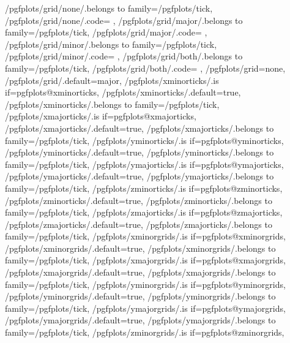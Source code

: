 {	/pgfplots/grid/none/.belongs to family=/pgfplots/tick,
	/pgfplots/grid/none/.code={%
		\pgfplots@xminorgridsfalse
		\pgfplots@yminorgridsfalse
		\pgfplots@zminorgridsfalse
		\pgfplots@xmajorgridsfalse
		\pgfplots@ymajorgridsfalse
		\pgfplots@zmajorgridsfalse
	},
	/pgfplots/grid/major/.belongs to family=/pgfplots/tick,
	/pgfplots/grid/major/.code={%
		\pgfplots@xminorgridsfalse
		\pgfplots@yminorgridsfalse
		\pgfplots@zminorgridsfalse
		\pgfplots@xmajorgridstrue
		\pgfplots@ymajorgridstrue
		\pgfplots@zmajorgridstrue
	},
	/pgfplots/grid/minor/.belongs to family=/pgfplots/tick,
	/pgfplots/grid/minor/.code={%
		\pgfplots@xminorgridstrue
		\pgfplots@yminorgridstrue
		\pgfplots@zminorgridstrue
		\pgfplots@xmajorgridsfalse
		\pgfplots@ymajorgridsfalse
		\pgfplots@zmajorgridsfalse
	},
	/pgfplots/grid/both/.belongs to family=/pgfplots/tick,
	/pgfplots/grid/both/.code={%
		\pgfplots@xminorgridstrue
		\pgfplots@yminorgridstrue
		\pgfplots@zminorgridstrue
		\pgfplots@xmajorgridstrue
		\pgfplots@ymajorgridstrue
		\pgfplots@zmajorgridstrue
	},
	/pgfplots/grid=none,
	/pgfplots/grid/.default=major,
	/pgfplots/xminorticks/.is if=pgfplots@xminorticks,
	/pgfplots/xminorticks/.default=true,
	/pgfplots/xminorticks/.belongs to family=/pgfplots/tick,
	/pgfplots/xmajorticks/.is if=pgfplots@xmajorticks,
	/pgfplots/xmajorticks/.default=true,
	/pgfplots/xmajorticks/.belongs to family=/pgfplots/tick,
	/pgfplots/yminorticks/.is if=pgfplots@yminorticks,
	/pgfplots/yminorticks/.default=true,
	/pgfplots/yminorticks/.belongs to family=/pgfplots/tick,
	/pgfplots/ymajorticks/.is if=pgfplots@ymajorticks,
	/pgfplots/ymajorticks/.default=true,
	/pgfplots/ymajorticks/.belongs to family=/pgfplots/tick,
	/pgfplots/zminorticks/.is if=pgfplots@zminorticks,
	/pgfplots/zminorticks/.default=true,
	/pgfplots/zminorticks/.belongs to family=/pgfplots/tick,
	/pgfplots/zmajorticks/.is if=pgfplots@zmajorticks,
	/pgfplots/zmajorticks/.default=true,
	/pgfplots/zmajorticks/.belongs to family=/pgfplots/tick,
	/pgfplots/xminorgrids/.is if=pgfplots@xminorgrids,
	/pgfplots/xminorgrids/.default=true,
	/pgfplots/xminorgrids/.belongs to family=/pgfplots/tick,
	/pgfplots/xmajorgrids/.is if=pgfplots@xmajorgrids,
	/pgfplots/xmajorgrids/.default=true,
	/pgfplots/xmajorgrids/.belongs to family=/pgfplots/tick,
	/pgfplots/yminorgrids/.is if=pgfplots@yminorgrids,
	/pgfplots/yminorgrids/.default=true,
	/pgfplots/yminorgrids/.belongs to family=/pgfplots/tick,
	/pgfplots/ymajorgrids/.is if=pgfplots@ymajorgrids,
	/pgfplots/ymajorgrids/.default=true,
	/pgfplots/ymajorgrids/.belongs to family=/pgfplots/tick,
	/pgfplots/zminorgrids/.is if=pgfplots@zminorgrids,
}
